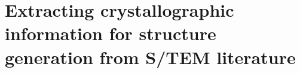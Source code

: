 




\section{Extracting crystallographic information for structure generation from S/TEM literature}

